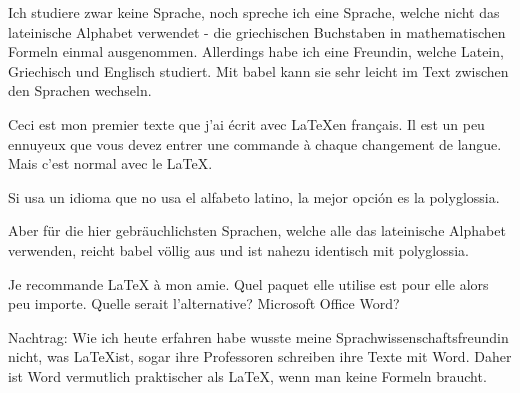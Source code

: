 \documentclass{scrartcl}
\begin{document}
Ich studiere zwar keine Sprache, noch spreche ich eine Sprache, welche nicht das lateinische Alphabet verwendet - die griechischen Buchstaben in mathematischen Formeln einmal ausgenommen. Allerdings habe ich eine Freundin, welche Latein, Griechisch und Englisch studiert. Mit babel kann sie sehr leicht im Text zwischen den Sprachen wechseln.

Ceci est mon premier texte que j'ai écrit avec \LaTeX  en français. Il est un peu ennuyeux que vous devez entrer une commande à chaque changement de langue. Mais c'est normal avec le \LaTeX.

Si usa un idioma que no usa el alfabeto latino, la mejor opción es la polyglossia.

Aber für die hier gebräuchlichsten Sprachen, welche alle das lateinische Alphabet verwenden, reicht babel völlig aus und ist nahezu identisch mit polyglossia.

Je recommande LaTeX à mon amie. Quel paquet elle utilise est pour elle alors peu importe. Quelle serait l'alternative? Microsoft Office Word?

Nachtrag: Wie ich heute erfahren habe wusste meine Sprachwissenschaftsfreundin nicht, was \LaTeX ist, sogar ihre Professoren schreiben ihre Texte mit Word. Daher ist Word vermutlich praktischer als \LaTeX, wenn man keine Formeln braucht.
\end{document}

